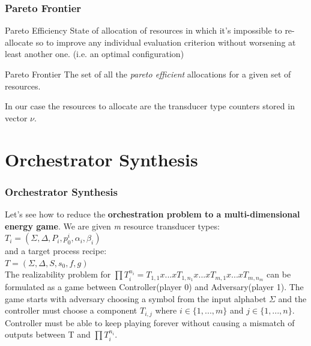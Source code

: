 \documentclass{beamer}
\begin{document}
\begin{frame}
\frametitle{Pareto Frontier}
\begin{block}{Pareto Efficiency}
State of allocation of resources in which it's impossible to re-allocate so to improve any individual evaluation criterion without worsening at least another one. (i.e. an optimal configuration)
\end{block}
\begin{block}{Pareto Frontier}
The set of all the \textit{pareto efficient} allocations for a given set of resources.
\end{block}
In our case the resources to allocate are the transducer type counters stored in vector $\nu$.
\end{frame}


\section{Orchestrator Synthesis}

\begin{frame}
\frametitle{Orchestrator Synthesis}
Let's see how to reduce the \textbf{orchestration problem to a multi-dimensional energy game}. 
\newline
\newline
We are given \textit{m} resource transducer types:\\
 $T_{i}=(\Sigma,\Delta,P_{i},p_{0}^{i},\alpha _{i},\beta _{i})$\\
and a target process recipe:\\
$T =(\Sigma,\Delta,S,s_{0},f,g)$\\
The realizability problem for $\prod T_{i}^{n_{i}}=T_{1,1}x...xT_{1,n_{1}}x...xT_{m,1}x...xT_{m,n_{m}}$ can be formulated as a game between Controller(player 0) and Adversary(player 1).
The game starts with adversary choosing a symbol from the input alphabet $\Sigma$ and the controller must choose a component $T_{i,j}$ where $i \in \{ 1,...,m \}$ and $j\in \{ 1,...,n \} $. \\
Controller must be able to keep playing forever without causing a mismatch of outputs between T and $\prod T_{i}^{n_{i}}$.

\end{frame}
\end{document}
